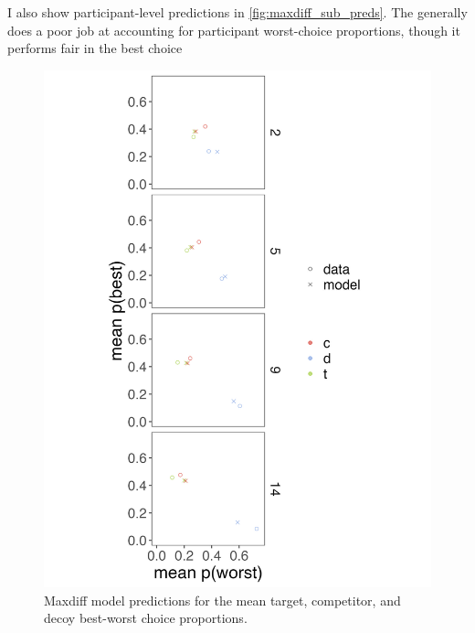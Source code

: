 {{{{I also show participant-level predictions in \ref{fig:maxdiff_sub_preds}. The generally does a poor job at accounting for participant worst-choice proportions, though it performs fair in the best choice 
\begin{figure}
   \includegraphics[width=\linewidth]{figures/maxdiff_2_means_model_v_data.jpeg}
   \caption{Maxdiff model predictions for the mean target, competitor, and decoy best-worst choice proportions.}
   \label{fig:maxdiff_collapsed_preds}
\end{figure}

}}}}
